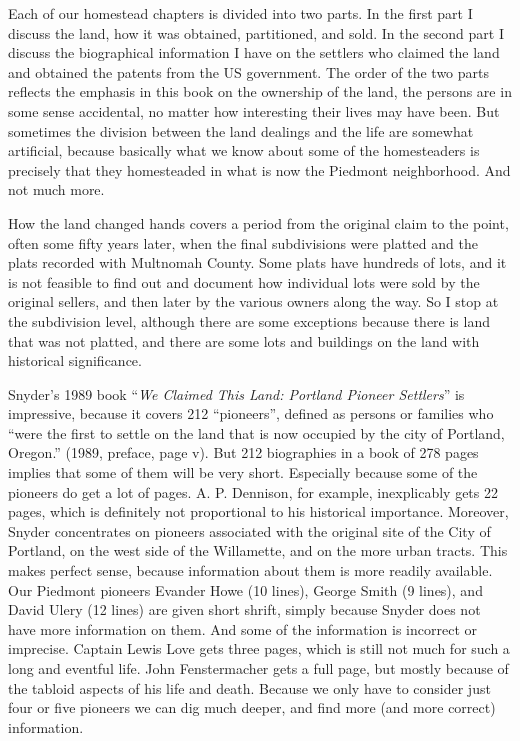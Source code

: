 \documentclass[
  12pt,
]{book}
\begin{document}
Each of our homestead chapters is divided into two parts. In the first part I discuss the land, how it was obtained, partitioned, and sold. In the second part I discuss the biographical information I have on the settlers who claimed the land and obtained the patents from the US government. The order of the two parts reflects the emphasis in this book on the ownership of the land, the persons are in some sense accidental, no matter how interesting their lives may have been. But sometimes the division between the land dealings and the life are somewhat artificial, because basically what we know about some of the homesteaders is precisely that they homesteaded in what is now the Piedmont neighborhood. And not much more.

How the land changed hands covers a period from the original claim to the point, often some fifty years later, when the final subdivisions were platted and the plats recorded with Multnomah County. Some plats have hundreds of lots, and it is not feasible to find out and document how individual lots were sold by the original sellers, and then later by the various owners along the way. So I stop at the subdivision level, although there are some exceptions because there is land that was not platted, and there are some lots and buildings on the land with historical significance.

Snyder's 1989 book ``\emph{We Claimed This Land: Portland Pioneer Settlers}'' is impressive, because it covers 212 ``pioneers'', defined as persons or families who ``were the first to settle on the land that is now occupied by the city of Portland, Oregon.'' (1989, preface, page v). But 212 biographies in a book of 278 pages implies that some of them will be very short. Especially because some of the pioneers do get a lot of pages. A. P. Dennison, for example, inexplicably gets 22 pages, which is definitely not proportional to his historical importance. Moreover, Snyder concentrates on pioneers associated with the original site of the City of Portland, on the west side of the Willamette, and on the more urban tracts. This makes perfect sense, because information about them is more readily available. Our Piedmont pioneers Evander Howe (10 lines), George Smith (9 lines), and David Ulery (12 lines) are given short shrift, simply because Snyder does not have more information on them. And some of the information is incorrect or imprecise. Captain Lewis Love gets three pages, which is still not much for such a long and eventful life. John Fenstermacher gets a full page, but mostly because of the tabloid aspects of his life and death. Because we only have to consider just four or five pioneers we can dig much deeper, and find more (and more correct) information.
\end{document}

